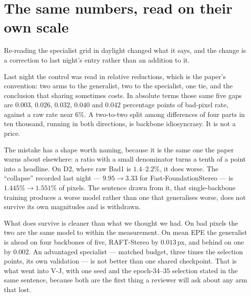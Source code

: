 \documentclass[11pt,a4paper]{article}
\begin{document}
\section*{The same numbers, read on their own scale}

Re-reading the specialist grid in daylight changed what it says, and the change
is a correction to last night's entry rather than an addition to it.

Last night the control was read in relative reductions, which is the paper's
convention: two arms to the generalist, two to the specialist, one tie, and the
conclusion that sharing sometimes costs. In absolute terms those same five gaps
are $0.003$, $0.026$, $0.032$, $0.040$ and $0.042$ percentage points of
bad-pixel rate, against a raw rate near $6\%$. A two-to-two split among
differences of four parts in ten thousand, running in both directions, is
backbone idiosyncrasy. It is not a price.

The mistake has a shape worth naming, because it is the same one the paper
warns about elsewhere: a ratio with a small denominator turns a tenth of a
point into a headline. On D2, where raw Bad1 is $1.4$--$2.2\%$, it does worse.
The ``collapse'' recorded last night --- $9.95\to3.33$ for
Fast-FoundationStereo --- is $1.445\%\to1.551\%$ of pixels. The sentence drawn
from it, that single-backbone training produces a worse model rather than one
that generalises worse, does not survive its own magnitudes and is withdrawn.

What does survive is cleaner than what we thought we had. On bad pixels the two
are the same model to within the measurement. On mean EPE the generalist is
ahead on four backbones of five, RAFT-Stereo by $0.013$\,px, and behind on one
by $0.002$. An advantaged specialist --- matched budget, three times the
selection points, its own validation --- is not better than one shared
checkpoint. That is what went into V-J, with one seed and the epoch-$34$--$35$
selection stated in the same sentence, because both are the first thing a
reviewer will ask about any arm that lost.
\end{document}
